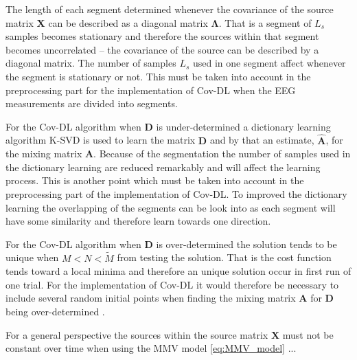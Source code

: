 The length of each segment determined whenever the covariance of the source matrix $\mathbf{X}$ can be described as a diagonal matrix $\boldsymbol{\Lambda}$. 
That is a segment of $L_s$ samples becomes stationary and therefore the sources within that segment becomes uncorrelated -- the covariance of the source can be described by a diagonal matrix. 
The number of samples $L_s$ used in one segment affect whenever the segment is stationary or not. 
This must be taken into account in the preprocessing part for the implementation of Cov-DL when the EEG measurements are divided into segments.

For the Cov-DL algorithm when $\mathbf{D}$ is under-determined a dictionary learning algorithm K-SVD is used to learn the matrix $\mathbf{D}$ and by that an estimate, $\hat{\mathbf{A}}$, for the mixing matrix $\mathbf{A}$. 
Because of the segmentation the number of samples used in the dictionary learning are reduced remarkably and will affect the learning process. 
This is another point which must be taken into account in the preprocessing part of the implementation of Cov-DL. 
To improved the dictionary learning the overlapping of the segments can be look into as each segment will have some similarity and therefore learn towards one direction.

For the Cov-DL algorithm when $\mathbf{D}$ is over-determined the solution tends to be unique when $M < N < \widetilde{M}$ from testing the solution. 
That is the cost function tends toward a local minima and therefore an unique solution occur in first run of one trial. 
For the implementation of Cov-DL it would therefore be necessary to include several random initial points when finding the mixing matrix $\mathbf{A}$ for $\mathbf{D}$ being over-determined .

For a general perspective the sources within the source matrix $\mathbf{X}$ must not be constant over time when using the MMV model \eqref{eq:MMV_model} ...